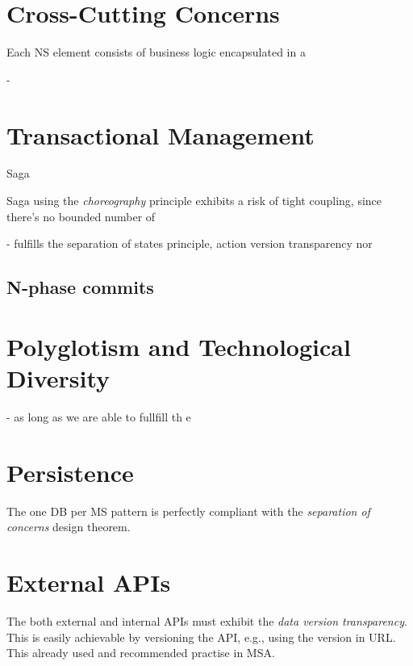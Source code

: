 \documentclass[thesis=M,english,hidelinks]{FITthesis}[2012/10/20]
\begin{document}
\section{Cross-Cutting Concerns}
\label{sec:ccc}

Each \acrshort{NS} element consists of business logic encapsulated in a 


- 






\section{Transactional Management}
\label{sec:appl:trans}

Saga 





Saga using the \textit{choreography} principle exhibits a risk of tight coupling, since there's no bounded number of 

- fulfills the separation of states principle, action version transparency nor 


\subsection{N-phase commits}
\label{sec:appl:nphase}




\section{Polyglotism and Technological Diversity}


- as long as we are able to fullfill th e
\section{Persistence}
The one DB per \acrshort{MS} pattern is perfectly compliant with the \textit{separation of concerns} design theorem.

\section{External APIs}
The both external and internal APIs must exhibit the \textit{data version transparency}. This is easily achievable by versioning the API, e.g., using the version in URL. This already used and recommended practise in \acrshort{MSA}.

% 
% 
\end{document}
